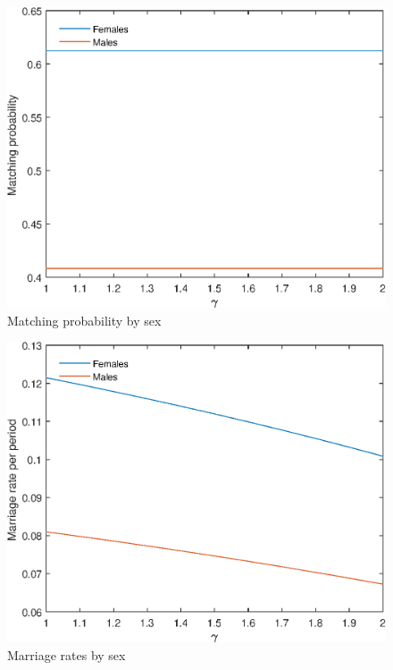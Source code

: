 \documentclass[12pt]{article}
\begin{document}
\begin{figure}
	\centering
	\caption{Matching probability by sex}
	\includegraphics{Graphs/match_prob_gamma_ex1.eps}
\end{figure}

\begin{figure}
	\centering
	\caption{Marriage rates by sex}
	\includegraphics{Graphs/marr_rates_gamma_ex1.eps}
\end{figure}
\end{document}
